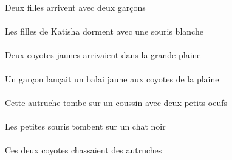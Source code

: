 \begin{exe}
Deux filles arrivent avec deux garçons
\ex\gll
\DEFPlAbs{}    \INDSgObl{}   \KatishaASgObl{}   \DE{}   \filleCPlAbs{}    \INDSgObl{}   \blancASg{}   \sourisASgObl{}   \AVEC{}  \dormirViPrsCPl{}\\
\DEFPlAbsP{}    \INDSgOblP{}   \KatishaASgOblP{}   \DEP{}   \filleCPlAbsP{}    \INDSgOblP{}   \blancASgP{}   \sourisASgOblP{}   \AVECP{}  \dormirViPrsCPlP{}\\
Les filles de Katisha dorment avec une souris blanche
\ex\gll
\INDDuAbs{}   \jauneADu{}   \coyoteADuAbs{}    \DEFSgObl{}   \grandCSg{}   \plaineCSgObl{}   \DANS{}  \arriverViPstADu{}\\
\INDDuAbsP{}   \jauneADuP{}   \coyoteADuAbsP{}    \DEFSgOblP{}   \grandCSgP{}   \plaineCSgOblP{}   \DANSP{}  \arriverViPstADuP{}\\
Deux coyotes jaunes arrivaient dans la grande plaine
\ex\gll
\INDSgErg{}   \garconBSgErg{}    \DEFPlDat{}    \DEFSgObl{}   \plaineCSgObl{}   \DE{}   \coyoteAPlDat{}   \INDSgAbs{}   \jauneCSg{}   \balaiCSgAbs{}  \lancerVdPstCSg{}\\
\INDSgErgP{}   \garconBSgErgP{}    \DEFPlDatP{}    \DEFSgOblP{}   \plaineCSgOblP{}   \DEP{}   \coyoteAPlDatP{}   \INDSgAbsP{}   \jauneCSgP{}   \balaiCSgAbsP{}  \lancerVdPstCSgP{}\\
Un garçon lançait un balai jaune aux coyotes de la plaine
\ex\gll
\INDDuObl{}   \petitDDu{}   \oeufDDuObl{}   \AVEC{}   \DEMSgAbs{}   \autrucheDSgAbs{}    \INDSgObl{}   \coussinASgObl{}   \SUR{}  \tomberViPrsDSg{}\\
\INDDuOblP{}   \petitDDuP{}   \oeufDDuOblP{}   \AVECP{}   \DEMSgAbsP{}   \autrucheDSgAbsP{}    \INDSgOblP{}   \coussinASgOblP{}   \SURP{}  \tomberViPrsDSgP{}\\
Cette autruche tombe sur un coussin avec deux petits oeufs
\ex\gll
\DEFPlAbs{}   \petitAPl{}   \sourisAPlAbs{}    \INDSgObl{}   \noirDSg{}   \chatDSgObl{}   \SUR{}  \tomberViPrsAPl{}\\
\DEFPlAbsP{}   \petitAPlP{}   \sourisAPlAbsP{}    \INDSgOblP{}   \noirDSgP{}   \chatDSgOblP{}   \SURP{}  \tomberViPrsAPlP{}\\
Les petites souris tombent sur un chat noir
\ex\gll
\DEMDuErg{}   \coyoteADuErg{}   \INDPlAbs{}   \autrucheDPlAbs{}  \chasserVtPstDPl{}\\
\DEMDuErgP{}   \coyoteADuErgP{}   \INDPlAbsP{}   \autrucheDPlAbsP{}  \chasserVtPstDPlP{}\\
Ces deux coyotes chassaient des autruches
\ex\gll
\DEFPlErg{}   \coyoteAPlErg{}    \DEMPlDat{}   \chatDPlDat{}   \INDSgAbs{}   \sourisASgAbs{}  \lancerVdPstASg{}\\

\end{exe}
